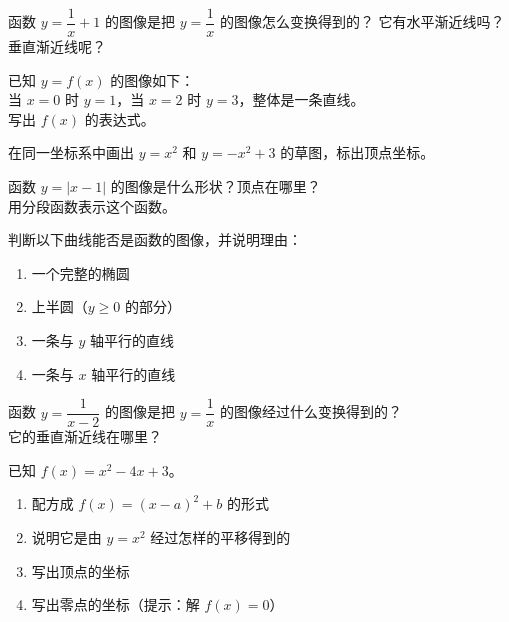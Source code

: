 \begin{exercise}[2]
函数 \(y = \dfrac{1}{x} + 1\) 的图像是把 \(y = \dfrac{1}{x}\) 的图像怎么变换得到的？
它有水平渐近线吗？垂直渐近线呢？
\end{exercise}

\begin{exercise}[2]
已知 \(y = f(x)\) 的图像如下：\\
当 \(x = 0\) 时 \(y = 1\)，当 \(x = 2\) 时 \(y = 3\)，整体是一条直线。\\
写出 \(f(x)\) 的表达式。
\end{exercise}


\begin{exercise}[3]
在同一坐标系中画出 \(y = x^2\) 和 \(y = -x^2 + 3\) 的草图，标出顶点坐标。
\end{exercise}

\begin{exercise}[3]
函数 \(y = |x - 1|\) 的图像是什么形状？顶点在哪里？\\
用分段函数表示这个函数。
\end{exercise}

\begin{exercise}[3]
判断以下曲线能否是函数的图像，并说明理由：
\begin{enumerate}
  \item[(1)] 一个完整的椭圆
  \item[(2)] 上半圆（\(y \ge 0\) 的部分）
  \item[(3)] 一条与 \(y\) 轴平行的直线
  \item[(4)] 一条与 \(x\) 轴平行的直线
\end{enumerate}
\end{exercise}

\begin{exercise}[3]
函数 \(y = \dfrac{1}{x - 2}\) 的图像是把 \(y = \dfrac{1}{x}\) 的图像经过什么变换得到的？\\
它的垂直渐近线在哪里？
\end{exercise}

\begin{exercise}[3]
已知 \(f(x) = x^2 - 4x + 3\)。
\begin{enumerate}
  \item[(1)] 配方成 \(f(x) = (x - a)^2 + b\) 的形式
  \item[(2)] 说明它是由 \(y = x^2\) 经过怎样的平移得到的
  \item[(3)] 写出顶点的坐标
  \item[(4)] 写出零点的坐标（提示：解 \(f(x) = 0\)）
\end{enumerate}
\end{exercise}

